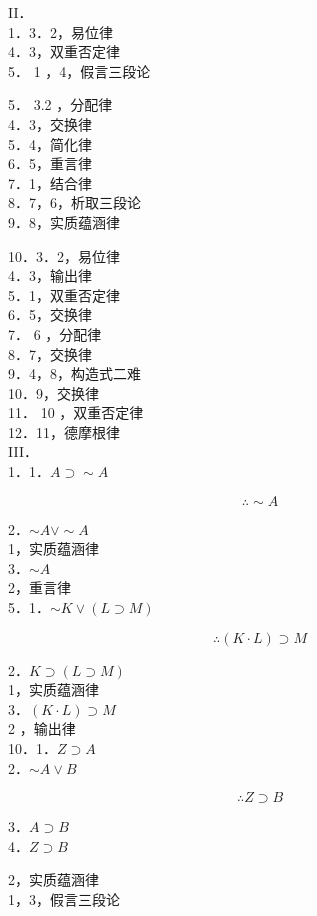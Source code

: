II．\\
1．3．2，易位律\\
4．3，双重否定律\\
5． 1 ，4，假言三段论

5． 3.2 ，分配律\\
4．3，交换律\\
5．4，简化律\\
6．5，重言律\\
7．1，结合律\\
8．7，6，析取三段论\\
9．8，实质蕴涵律

10．3．2，易位律\\
4．3，输出律\\
5．1，双重否定律\\
6．5，交换律\\
7． 6 ，分配律\\
8．7，交换律\\
9．4，8，构造式二难\\
10．9，交换律\\
11． 10 ，双重否定律\\
12．11，德摩根律\\
III．\\
1．1．$A \supset \sim A$

$$
\therefore \sim A
$$

2．$\sim A \vee \sim A$\\
1，实质蕴涵律\\
3．$\sim A$\\
2，重言律\\
5．1．$\sim K \vee(L \supset M)$

$$
\therefore(K \cdot L) \supset M
$$

2．$K \supset(L \supset M)$\\
1，实质蕴涵律\\
3．$(K \cdot L) \supset M$\\
2 ，输出律\\
10．1．$Z \supset A$\\
2．$\sim A \vee B$

$$
\therefore Z \supset B
$$

3．$A \supset B$\\
4．$Z \supset B$

2，实质蕴涵律\\
1，3，假言三段论

